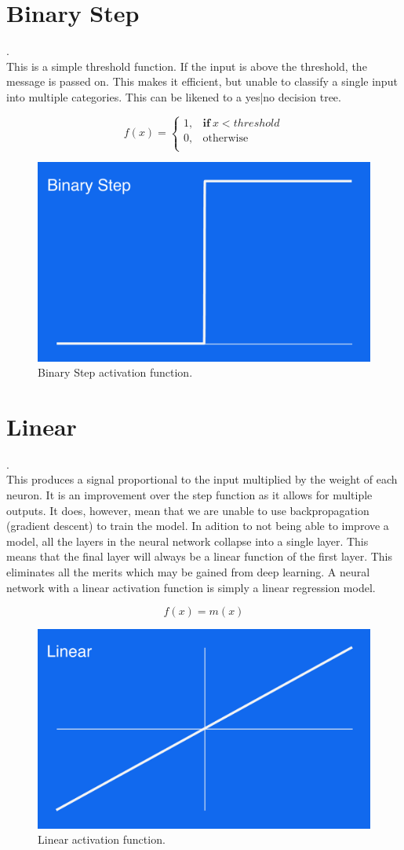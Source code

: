 \section{Binary Step}.\\
This is a simple threshold function. If the input is above the threshold, the message is passed on. This makes it efficient, but unable to classify a single input into multiple categories. This can be likened to a yes|no decision tree.

\begin{equation}
f(x) =
    \begin{cases}
      1 , & \mathbf{if} \ x < threshold \\
      0 , & \text{otherwise}\\

    \end{cases}
  \end{equation}

\begin{figure}[H]
\centering
\includegraphics[width=.265\textwidth]{binary.png}
\caption{Binary Step activation function.}
\end{figure}



\section{Linear}.\\

This produces a signal proportional to the input multiplied by the weight of each neuron. It is an improvement over the step function as it allows for multiple outputs. It does, however, mean that we are unable to use backpropagation (gradient descent) to train the model. In adition to not being able to improve a model, all the layers in the neural network collapse into a single layer. This means that the final layer will always be a linear function of the first layer. This eliminates all the merits which may be gained from deep learning. A neural network with a linear activation function is simply a linear regression model.

\begin{equation}
    f(x) = m(x)
\end{equation}
\begin{figure}[H]
\centering
\includegraphics[width=.265\textwidth]{linear.png}
\caption{Linear activation function.}
\end{figure}

